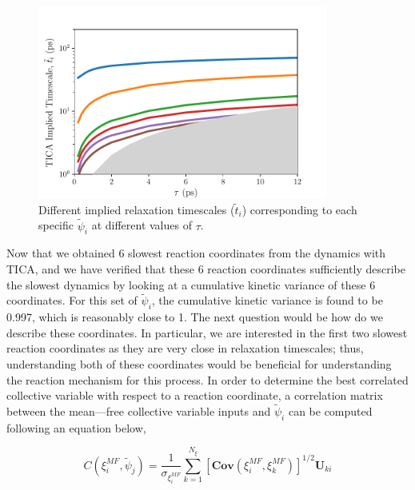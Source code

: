 \begin{spacing}{2.0}
    \begin{figure}[t]
        \centering
        \includegraphics[width=0.85\textwidth]{./figs/fig3-01}
        \caption{Different implied relaxation timescales ($\tilde{t}_i$) corresponding to each specific $\tilde{\psi}_i$ at different values of $\tau$.}
        \label{fig:tica-timescales}
    \end{figure}

    Now that we obtained 6 slowest reaction coordinates from the dynamics with TICA, and we have verified that these 6 reaction coordinates sufficiently
    describe the slowest dynamics by looking at a cumulative kinetic variance of these 6 coordinates. For this set of $\tilde{\psi}_i$, the cumulative
    kinetic variance is found to be 0.997, which is reasonably close to 1. The next question would be how do we describe these coordinates. 
    In particular, we are interested in the first two slowest reaction coordinates as they are very close in relaxation timescales; thus, 
    understanding both of these coordinates would be beneficial for understanding the reaction mechanism for this process. In order to determine 
    the best correlated collective variable with respect to a reaction coordinate, a correlation matrix between the mean—free collective variable 
    inputs and $\tilde{\psi}_i$ can be computed following an equation below,

    \begin{equation}
	C(\xi_i^{MF}, \tilde{\psi}_j) = \frac{1}{\sigma_{\xi_i^{MF}}}\sum_{k=1}^{N_{\xi}} \left[\mathbf{Cov}(\xi_i^{MF}, \xi_k^{MF})\right]^{1/2}\mathbf{U}_{ki}
        \label{eq:features-tic-correlation}
    \end{equation}


\end{spacing}
